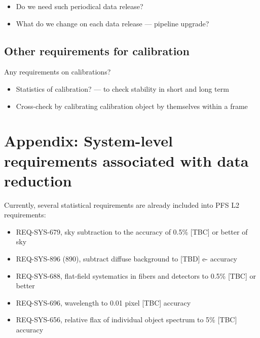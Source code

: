 \documentclass[a4paper,notitlepage]{article}
\begin{document}
\begin{itemize}
  \item Do we need such periodical data release?
  \item What do we change on each data release --- pipeline upgrade?
\end{itemize}


\subsection{Other requirements for calibration}

Any requirements on calibrations?

\begin{itemize}
  \item Statistics of calibration? --- to check stability in short and long 
    term
  \item Cross-check by calibrating calibration object by themselves within a 
    frame
\end{itemize}

\section*{Appendix: System-level requirements associated with data reduction}

Currently, several statistical requirements are already included into
PFS L2 requirements:
\begin{itemize}
  \item REQ-SYS-679, sky subtraction to the accuracy of 0.5\% [TBC] or better 
    of sky
  \item REQ-SYS-896 (890), subtract diffuse background to [TBD] e- accuracy
  \item REQ-SYS-688, flat-field systematics in fibers and detectors to 0.5\% 
    [TBC] or better
  \item REQ-SYS-696, wavelength to 0.01 pixel [TBC] accuracy
  \item REQ-SYS-656, relative flax of individual object spectrum to 5\% [TBC]
    accuracy
\end{itemize}
\end{document}
